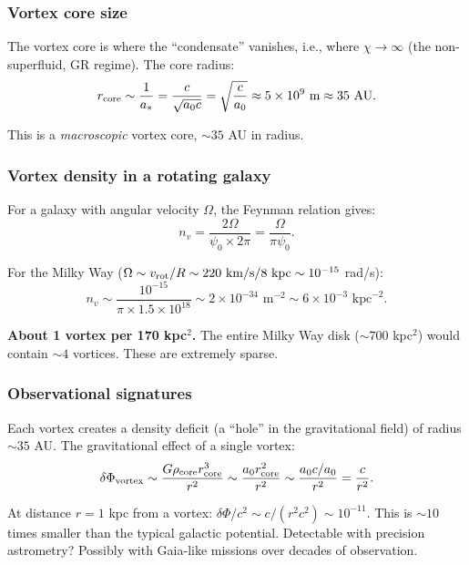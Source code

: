 \documentclass[11pt,a4paper]{article}
\begin{document}
\subsubsection{Vortex core size}

The vortex core is where the ``condensate'' vanishes, i.e., where $\chi \to \infty$ (the non-superfluid, GR regime). The core radius:
\begin{equation}
r_{\rm core} \sim \frac{1}{a_*} = \frac{c}{\sqrt{a_0 c}} = \sqrt{\frac{c}{a_0}} \approx 5 \times 10^9 \text{ m} \approx 35 \text{ AU}.
\end{equation}

This is a \emph{macroscopic} vortex core, $\sim 35$ AU in radius.

\subsubsection{Vortex density in a rotating galaxy}

For a galaxy with angular velocity $\Omega$, the Feynman relation gives:
\begin{equation}
n_v = \frac{2\Omega}{\psi_0 \times 2\pi} = \frac{\Omega}{\pi\psi_0}.
\end{equation}

For the Milky Way ($\Omega \sim v_{\rm rot}/R \sim 220\text{ km/s}/8\text{ kpc} \sim 10^{-15}$ rad/s):
\begin{equation}
n_v \sim \frac{10^{-15}}{\pi \times 1.5\times10^{18}} \sim 2 \times 10^{-34}\text{ m}^{-2} \sim 6 \times 10^{-3}\text{ kpc}^{-2}.
\end{equation}

\textbf{About 1 vortex per 170 kpc$^2$.} The entire Milky Way disk ($\sim 700$ kpc$^2$) would contain $\sim 4$ vortices. These are extremely sparse.

\subsubsection{Observational signatures}

Each vortex creates a density deficit (a ``hole'' in the gravitational field) of radius $\sim 35$ AU. The gravitational effect of a single vortex:
\begin{equation}
\delta\Phi_{\rm vortex} \sim \frac{G \rho_{\rm core} r_{\rm core}^3}{r^2} \sim \frac{a_0 r_{\rm core}^2}{r^2} \sim \frac{a_0 c/a_0}{r^2} = \frac{c}{r^2}.
\end{equation}

At distance $r = 1$ kpc from a vortex: $\delta\Phi/c^2 \sim c/(r^2 c^2) \sim 10^{-11}$. This is $\sim 10$ times smaller than the typical galactic potential. Detectable with precision astrometry? Possibly with Gaia-like missions over decades of observation.
\end{document}
